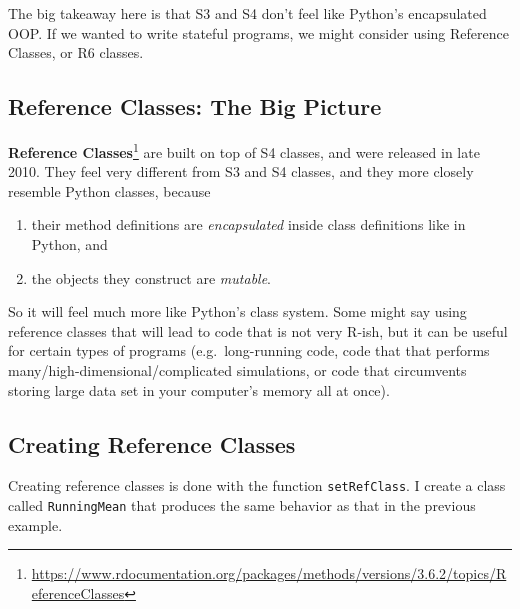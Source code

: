 \documentclass[12pt,krantz2]{krantz}
\providecommand{\tightlist}{%
  \setlength{\itemsep}{0pt}\setlength{\parskip}{0pt}}
\renewcommand{\href}[2]{#2\footnote{\url{#1}}}
\begin{document}
The big takeaway here is that S3 and S4 don't feel like Python's encapsulated OOP. If we wanted to write stateful programs, we might consider using Reference Classes, or R6 classes.

\hypertarget{reference-classes-the-big-picture}{%
\subsection{Reference Classes: The Big Picture}\label{reference-classes-the-big-picture}}

\href{https://www.rdocumentation.org/packages/methods/versions/3.6.2/topics/ReferenceClasses}{\textbf{Reference Classes}} are built on top of S4 classes, and were released in late 2010. They feel very different from S3 and S4 classes, and they more closely resemble Python classes, because

\begin{enumerate}
\def\labelenumi{\arabic{enumi}.}
\tightlist
\item
  their method definitions are \emph{encapsulated} inside class definitions like in Python, and
\item
  the objects they construct are \emph{mutable}.
\end{enumerate}

So it will feel much more like Python's class system. Some might say using reference classes that will lead to code that is not very R-ish, but it can be useful for certain types of programs (e.g.~long-running code, code that that performs many/high-dimensional/complicated simulations, or code that circumvents storing large data set in your computer's memory all at once).

\hypertarget{creating-reference-classes}{%
\subsection{Creating Reference Classes}\label{creating-reference-classes}}

Creating reference classes is done with the function \texttt{setRefClass}. I create a class called \texttt{RunningMean} that produces the same behavior as that in the previous example.
\end{document}
